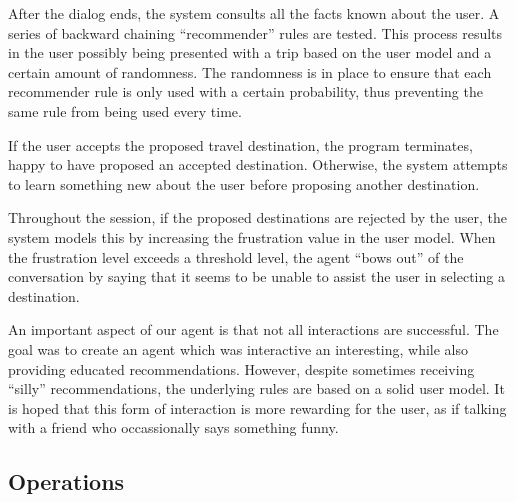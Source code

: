 \documentclass[11pt]{article} %
\begin{document}
After the dialog ends, the system consults all the facts known about the user. A series of backward chaining ``recommender'' rules are tested. This process results in the user possibly being presented with a trip based on the user model and a certain amount of randomness. The randomness is in place to ensure that each recommender rule is only used with a certain probability, thus preventing the same rule from being used every time.

If the user accepts the proposed travel destination, the program terminates, happy to have proposed an accepted destination. Otherwise, the system attempts to learn something new about the user before proposing another destination.

Throughout the session, if the proposed destinations are rejected by the user, the system models this by increasing the frustration value in the user model. When the frustration level exceeds a threshold level, the agent ``bows out'' of the conversation by saying that it seems to be unable to assist the user in selecting a destination.

An important aspect of our agent is that not all interactions are successful. The goal was to create an agent which was interactive an interesting, while also providing educated recommendations. However, despite sometimes receiving ``silly'' recommendations, the underlying rules are based on a solid user model. It is hoped that this form of interaction is more rewarding for the user, as if talking with a friend who occassionally says something funny.

\subsection{Operations}
\end{document}
